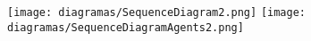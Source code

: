 %

\newpage
\texttt{[image: diagramas/SequenceDiagram2.png]}
\newpage
\texttt{[image: diagramas/SequenceDiagramAgents2.png]}
